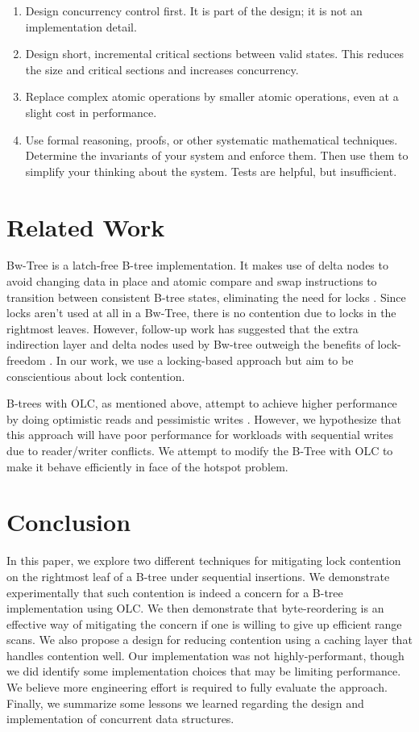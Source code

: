 \documentclass[twocolumn]{article}
\begin{document}
\begin{enumerate}
\item Design concurrency control first. It is part of the design; it is not an
implementation detail.
\item Design short, incremental critical sections between valid states. This
reduces the size and critical sections and increases concurrency.
\item Replace complex atomic operations by smaller atomic operations, even at a
slight cost in performance.
\item Use formal reasoning, proofs, or other systematic mathematical
techniques. Determine the invariants of your system and enforce them. Then use
them to simplify your thinking about the system. Tests are helpful, but
insufficient.
\end{enumerate}

\section{Related Work}

Bw-Tree is a latch-free B-tree implementation. It makes use of delta nodes to
avoid changing data in place and atomic compare and swap instructions to
transition between consistent B-tree states, eliminating the need for locks
\cite{bwtree}. Since locks aren’t used at all in a Bw-Tree, there is no contention due to
locks in the rightmost leaves. However, follow-up work has suggested that the
extra indirection layer and delta nodes used by Bw-tree outweigh the benefits
of lock-freedom \cite{critique}. In our work, we use a locking-based approach but aim to be
conscientious about lock contention.

B-trees with OLC, as mentioned above, attempt to achieve higher performance by
doing optimistic reads and pessimistic writes \cite{olc, art}. However, we hypothesize
that this approach will have poor performance for workloads with sequential
writes due to reader/writer conflicts. We attempt to modify the B-Tree with OLC
to make it behave efficiently in face of the hotspot problem.

\section{Conclusion}

In this paper, we explore two different techniques for mitigating lock
contention on the rightmost leaf of a B-tree under sequential insertions. We
demonstrate experimentally that such contention is indeed a concern for a
B-tree implementation using OLC. We then demonstrate that byte-reordering is an
effective way of mitigating the concern if one is willing to give up efficient
range scans. We also propose a design for reducing contention using a caching
layer that handles contention well. Our implementation was not
highly-performant, though we did identify some implementation choices that may
be limiting performance. We believe more engineering effort is required to
fully evaluate the approach. Finally, we summarize some lessons we learned
regarding the design and implementation of concurrent data structures.
\end{document}
